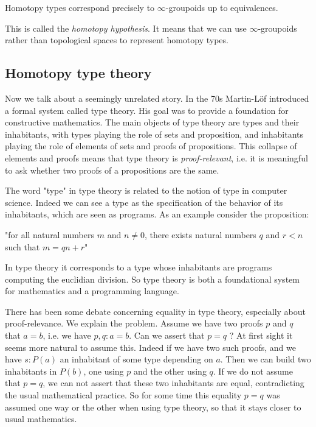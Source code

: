 \documentclass{article}
\newcommand{\sse}[1]{\medbreak \subsection{#1}}
\begin{document}
\begin{center}
Homotopy types correspond precisely to $\infty$-groupoids up to equivalences.
\end{center} 

This is called the \emph{homotopy hypothesis}. It means that we can use $\infty$-groupoids rather than topological spaces to represent homotopy types.







\sse{Homotopy type theory}

Now we talk about a seemingly unrelated story. In the 70s Martin-L{\"o}f introduced a formal system called type theory. His goal was to provide a foundation for constructive mathematics. The main objects of type theory are types and their inhabitants, with types playing the role of sets and proposition, and inhabitants playing the role of elements of sets and proofs of propositions. This collapse of elements and proofs means that type theory is \emph{proof-relevant}, i.e. it is meaningful to ask whether two proofs of a propositions are the same.

The word "type" in type theory is related to the notion of type in computer science. Indeed we can see a type as the specification of the behavior of its inhabitants, which are seen as programs. As an example consider the proposition: 
\begin{center}
"for all natural numbers $m$ and $n\neq 0$, there exists natural numbers $q$ and $r<n$ such that $m = qn+r$"
\end{center}

In type theory it corresponds to a type whose inhabitants are programs computing the euclidian division. So type theory is both a foundational system for mathematics and a programming language.%

There has been some debate concerning equality in type theory, especially about proof-relevance. We explain the problem. Assume we have two proofs $p$ and $q$ that $a=b$, i.e. we have $p,q:a=b$. Can we assert that $p=q$ ? At first sight it seems more natural to assume this. Indeed if we have two such proofs, and we have $s:P(a)$ an inhabitant of some type depending on $a$. Then we can build two inhabitants in $P(b)$, one using $p$ and the other using $q$. If we do not assume that $p=q$, we can not assert that these two inhabitants are equal, contradicting the usual mathematical practice. So for some time this equality $p=q$ was assumed one way or the other when using type theory, so that it stays closer to usual mathematics.
\end{document}
